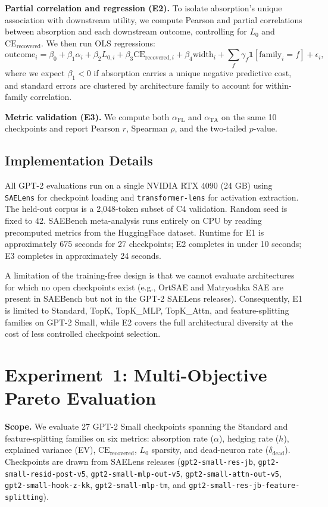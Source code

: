 \documentclass{article}
\begin{document}
\textbf{Partial correlation and regression (E2).} To isolate absorption's unique association with downstream utility, we compute Pearson and partial correlations between absorption and each downstream outcome, controlling for $L_0$ and $\text{CE}_{\text{recovered}}$. We then run OLS regressions:
\begin{equation}
\text{outcome}_i = \beta_0 + \beta_1 \alpha_i + \beta_2 L_{0,i} + \beta_3 \text{CE}_{\text{recovered},i} + \beta_4 \text{width}_i + \sum_{f} \gamma_f \mathbf{1}[\text{family}_i = f] + \epsilon_i,
\end{equation}
where we expect $\beta_1 < 0$ if absorption carries a unique negative predictive cost, and standard errors are clustered by architecture family to account for within-family correlation.

\textbf{Metric validation (E3).} We compute both $\alpha_{\text{FL}}$ and $\alpha_{\text{TA}}$ on the same 10 checkpoints and report Pearson $r$, Spearman $\rho$, and the two-tailed $p$-value.

\subsection{Implementation Details}

All GPT-2 evaluations run on a single NVIDIA RTX 4090 (24 GB) using \texttt{SAELens} for checkpoint loading and \texttt{transformer-lens} for activation extraction. The held-out corpus is a 2,048-token subset of C4 validation. Random seed is fixed to 42. SAEBench meta-analysis runs entirely on CPU by reading precomputed metrics from the HuggingFace dataset. Runtime for E1 is approximately 675 seconds for 27 checkpoints; E2 completes in under 10 seconds; E3 completes in approximately 24 seconds.

A limitation of the training-free design is that we cannot evaluate architectures for which no open checkpoints exist (e.g., OrtSAE and Matryoshka SAE are present in SAEBench but not in the GPT-2 SAELens releases). Consequently, E1 is limited to Standard, TopK, TopK\_MLP, TopK\_Attn, and feature-splitting families on GPT-2 Small, while E2 covers the full architectural diversity at the cost of less controlled checkpoint selection.

\section{Experiment~1: Multi-Objective Pareto Evaluation}
\label{sec:exp1}

\textbf{Scope.} We evaluate 27 GPT-2 Small checkpoints spanning the Standard and feature-splitting families on six metrics: absorption rate ($\alpha$), hedging rate ($h$), explained variance (EV), $\text{CE}_{\text{recovered}}$, $L_0$ sparsity, and dead-neuron rate ($\delta_{\text{dead}}$). Checkpoints are drawn from SAELens releases (\texttt{gpt2-small-res-jb}, \texttt{gpt2-small-resid-post-v5}, \texttt{gpt2-small-mlp-out-v5}, \texttt{gpt2-small-attn-out-v5}, \texttt{gpt2-small-hook-z-kk}, \texttt{gpt2-small-mlp-tm}, and \texttt{gpt2-small-res-jb-feature-splitting}).
\end{document}
